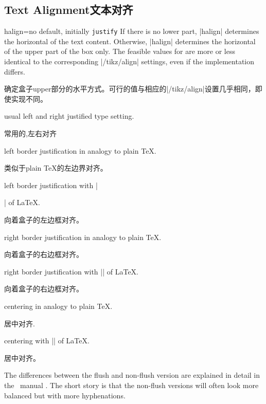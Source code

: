 \subsection{Text Alignment文本对齐}
\begin{docTcbKey}[][doc new=2015-05-07]{halign}{=}{no default, initially \texttt{justify}}
If there is no lower part, |halign| determines the horizontal 
of the text content.
Otherwise, |halign| determines the horizontal 
of the upper part of the box only.
The feasible values for  are more or less identical to
the corresponding |/tikz/align| settings, even if the implementation differs.

确定盒子upper部分的水平方式。可行的值与相应的|/tikz/align|设置几乎相同，即使实现不同。

\begin{DescriptionR}{}
\item[\docValue{justify}] usual left and right justified type setting.
\par 常用的,左右对齐%
\item[\docValue{left}]left border justification in analogy to plain \TeX.
\par 类似于plain \TeX 的左边界对齐。
\item[\docValue{flush left}]
left border justification with |\raggedright| of \LaTeX.
\par 向着盒子的左边框对齐。%
\item[\docValue{right}]right border justification in analogy to plain \TeX.
\par 向着盒子的右边框对齐。%
\item[\docValue{flush right}]right border justification with |\raggedleft| of \LaTeX.
\par 向着盒子的右边框对齐。%
\item[\docValue{center}]centering in analogy to plain \TeX.
\par 居中对齐.%
\item[\docValue{flush center}]centering with |\centering| of \LaTeX.
\par 居中对齐。%
\end{DescriptionR}
The differences between the flush and non-flush version are explained in
detail in the \tikzname\ manual \cite{tantau:tikz_and_pgf}. The short story is that
the non-flush versions will often look more balanced but with more
hyphenations.


\end{docTcbKey}
